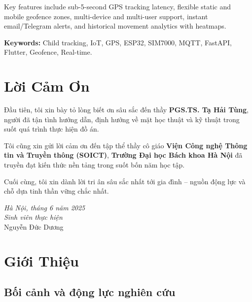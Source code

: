 \documentclass[13pt, a4paper]{report}
\newcommand{\authorname}{Nguyễn Đức Dương}
\newcommand{\advisor}{PGS.TS. Tạ Hải Tùng}
\newcommand{\department}{Viện Công nghệ Thông tin và Truyền thông (SOICT)}
\newcommand{\university}{Trường Đại học Bách khoa Hà Nội}
\begin{document}
\medskip
Key features include sub-5-second GPS tracking latency, flexible static and mobile geofence zones, multi-device and multi-user support, instant email/Telegram alerts, and historical movement analytics with heatmaps.

\medskip
\noindent\textbf{Keywords:} Child tracking, IoT, GPS, ESP32, SIM7000, MQTT, FastAPI, Flutter, Geofence, Real-time.

\clearpage

\chapter*{Lời Cảm Ơn}

Đầu tiên, tôi xin bày tỏ lòng biết ơn sâu sắc đến thầy \textbf{\advisor{}}, người đã tận tình hướng dẫn, định hướng về mặt học thuật và kỹ thuật trong suốt quá trình thực hiện đồ án.

Tôi cũng xin gửi lời cảm ơn đến tập thể thầy cô giáo \textbf{\department{}}, \textbf{\university{}} đã truyền đạt kiến thức nền tảng trong suốt bốn năm học tập.

Cuối cùng, tôi xin dành lời tri ân sâu sắc nhất tới gia đình -- nguồn động lực và chỗ dựa tinh thần vững chắc nhất.

\vspace{1.5cm}
\begin{flushright}
\textit{Hà Nội, tháng 6 năm 2025}\\[6pt]
\textit{Sinh viên thực hiện}\\[24pt]
\authorname{}
\end{flushright}
\clearpage

\tableofcontents
\clearpage
\listoffigures
\clearpage
\listoftables
\clearpage

\pagestyle{fancy}

\chapter{Giới Thiệu}

\section{Bối cảnh và động lực nghiên cứu}
\end{document}
